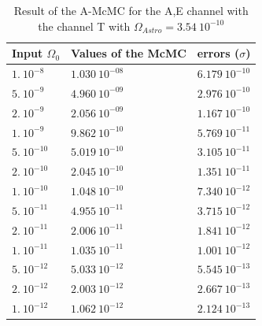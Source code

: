 \documentclass[a4paper,12pt]{article}
\begin{document}
\begin{table}[H]
\begin{center}
\begin{tabular}{|l|l|l|}
\hline
Input $\Omega_0$    & Values of the McMC    & errors ($\sigma$)   \\ \hline
$1. \ 10^{-8}$      & $1.030 \ 10^{-08}$    & $6.179 \ 10^{-10}$  \\ \hline
$5. \ 10^{-9}$      & $4.960 \ 10^{-09}$    & $2.976 \ 10^{-10}$  \\ \hline
$2. \ 10^{-9}$      & $2.056 \ 10^{-09}$    & $1.167 \ 10^{-10}$  \\ \hline
$1. \ 10^{-9}$      & $9.862 \ 10^{-10}$    & $5.769 \ 10^{-11}$  \\ \hline
$5. \ 10^{-10}$     & $5.019 \ 10^{-10}$    & $3.105 \ 10^{-11}$  \\ \hline
$2. \ 10^{-10}$     & $2.045 \ 10^{-10}$    & $1.351 \ 10^{-11}$  \\ \hline
$1. \ 10^{-10}$     & $1.048 \ 10^{-10}$    & $7.340 \ 10^{-12}$  \\ \hline
$5. \ 10^{-11}$     & $4.955 \ 10^{-11}$    & $3.715 \ 10^{-12}$  \\ \hline
$2. \ 10^{-11}$     & $2.006 \ 10^{-11}$    & $1.841 \ 10^{-12}$  \\ \hline
$1. \ 10^{-11}$     & $1.035 \ 10^{-11}$    & $1.001 \ 10^{-12}$  \\ \hline
$5. \ 10^{-12}$     & $5.033 \ 10^{-12}$    & $5.545 \ 10^{-13}$  \\ \hline
$2. \ 10^{-12}$     & $2.003 \ 10^{-12}$    & $2.667 \ 10^{-13}$  \\ \hline
$1. \ 10^{-12}$     & $1.062 \ 10^{-12}$    & $2.124 \ 10^{-13}$  \\ \hline
\end{tabular}
\end{center}
\caption{Result of the A-McMC for the A,E channel with the channel T with $\Omega_{Astro} = 3.54 \ 10^{-10}$}
\label{table:resultA+E+T-10}
\end{table}
\end{document}
